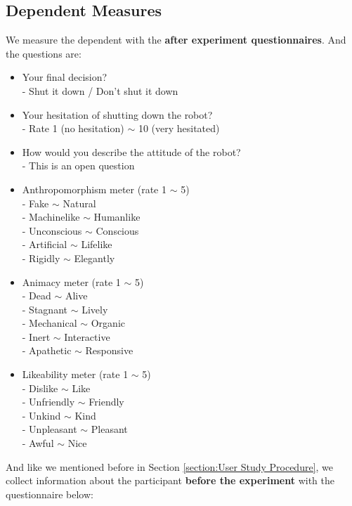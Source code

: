 \documentclass[conference]{IEEEtran}
\begin{document}
\subsection{Dependent Measures}


We measure the dependent with the \textbf{after experiment questionnaires}. And the questions are:

\begin{itemize}
    \item Your final decision?\\ 
     - Shut it down / Don't shut it down
    \item Your hesitation of shutting down the robot? \\
     - Rate 1 (no hesitation) $\sim$ 10 (very hesitated)
    \item How would you describe the attitude of the robot?
    \\ - This is an open question
    \item Anthropomorphism meter (rate 1 $\sim$ 5)
    \\ - Fake $\sim$ Natural
    \\ - Machinelike $\sim$ Humanlike
    \\ - Unconscious $\sim$ Conscious
    \\ - Artificial $\sim$ Lifelike
    \\ - Rigidly $\sim$ Elegantly
    \item Animacy meter (rate 1 $\sim$ 5)
    \\ - Dead $\sim$ Alive
    \\ - Stagnant $\sim$ Lively
    \\ - Mechanical $\sim$ Organic
    \\ - Inert $\sim$ Interactive
    \\ - Apathetic $\sim$ Responsive
    \item Likeability meter (rate 1 $\sim$ 5)
    \\ - Dislike $\sim$ Like
    \\ - Unfriendly $\sim$ Friendly
    \\ - Unkind $\sim$ Kind
    \\ - Unpleasant $\sim$ Pleasant
    \\ - Awful $\sim$ Nice
\end{itemize}


And like we mentioned before in Section \ref{section:User Study Procedure}, we collect information about the participant \textbf{before the experiment} with the questionnaire below:
\end{document}
